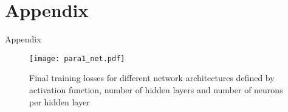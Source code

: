 \chapter{Appendix}\label{appendix}
Appendix
\begin{figure}
    \centering
    \texttt{[image: para1\_net.pdf]}
    \caption{Final training losses for different network architectures defined by activation function, number of hidden layers and number of neurons per hidden layer}
    \label{fig:twqetr}
\end{figure}